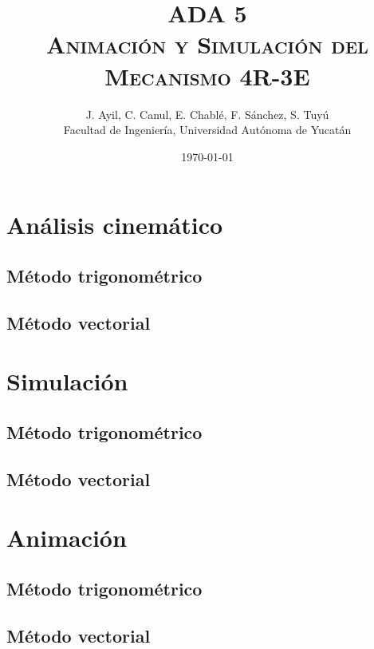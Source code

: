 \documentclass[12pt, final]{extarticle}
\title{ADA 5\\
\textsc{Animación y Simulación del Mecanismo 4R-3E}}
\author{J. Ayil, C. Canul, E. Chablé, F. Sánchez, S. Tuyú\\
{Facultad de Ingeniería, Universidad Autónoma de Yucatán}}
\date{\today}
\begin{document}
\maketitle

\begin{abstract}
    \blindtext
\end{abstract}

\section{Análisis cinemático}
\subsection{Método trigonométrico}

\subsection{Método vectorial}

\newpage
\section{Simulación}
\subsection{Método trigonométrico}

\subsection{Método vectorial}


\newpage
\section{Animación}
\subsection{Método trigonométrico}

\subsection{Método vectorial}


\nocite{*}
\vfill


\end{document}
